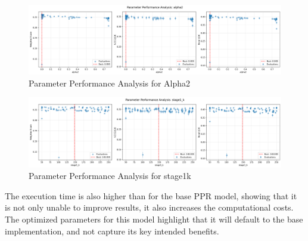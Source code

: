 \documentclass[conference,compsoc]{IEEEtran}
\begin{document}
\begin{figure}[!ht]
    \centering
    \includegraphics[width=\linewidth]{images/parameter_analysis_alpha2.png}
        \caption{Parameter Performance Analysis for Alpha2}
        \label{fig:tppr_alpha2}
\end{figure}
 \begin{figure}[!ht]
    \centering
    \includegraphics[width=\linewidth]{images/parameter_analysis_stage1_k.png}
    \caption{Parameter Performance Analysis for stage1k}
    \label{fig:tppr_stage1k}
\end{figure}

The execution time is also higher than for the base PPR model, showing that it is not only unable to improve results, it also increases the computational costs. The optimized parameters for this model highlight that it will default to the base implementation, and not capture its key intended benefits.
\end{document}
